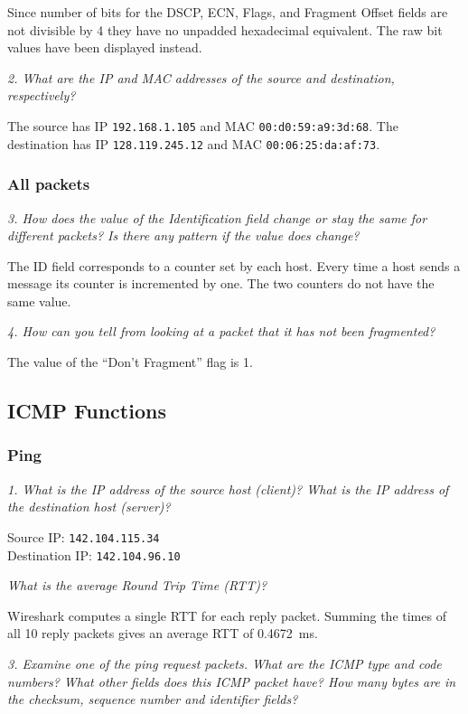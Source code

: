 Since number of bits for the DSCP, ECN, Flags, and Fragment Offset fields are not divisible by 4 they have no unpadded hexadecimal equivalent. The raw bit values have been displayed instead.

\textit{2. What are the IP and MAC addresses of the source and destination, respectively?}

The source has IP \texttt{192.168.1.105} and MAC \texttt{00:d0:59:a9:3d:68}. The destination has IP \texttt{128.119.245.12} and MAC \texttt{00:06:25:da:af:73}.

\pagebreak
\subsubsection{All packets}
\textit{3. How does the value of the Identification field change or stay the same for different packets? Is there any pattern if the value does change?}

The ID field corresponds to a counter set by each host. Every time a host sends a message its counter is incremented by one. The two counters do not have the same value.

\textit{4. How can you tell from looking at a packet that it has not been fragmented?}

The value of the ``Don't Fragment'' flag is 1.

\subsection{ICMP Functions}
\subsubsection{Ping}
\textit{1. What is the IP address of the source host (client)? What is the IP address of the destination host (server)?}

Source IP: \texttt{142.104.115.34} \\
Destination IP: \texttt{142.104.96.10}

\textit{What is the average Round Trip Time (RTT)?}

Wireshark computes a single RTT for each reply packet. Summing the times of all 10 reply packets gives an average RTT of \SI{0.4672}{\milli\second}.

\textit{3. Examine one of the ping request packets. What are the ICMP type and code numbers? What other fields does this ICMP packet have? How many bytes are in the checksum, sequence number and identifier fields?}

